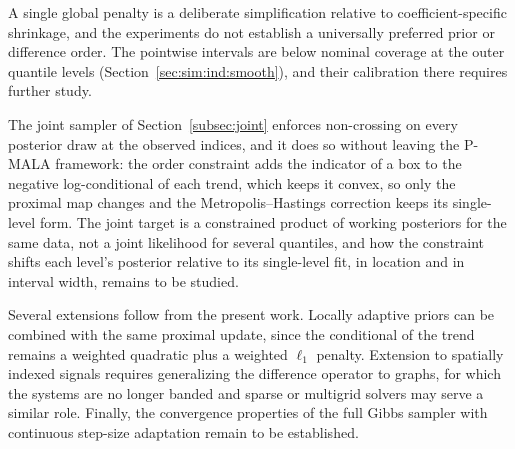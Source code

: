 A single global penalty is a deliberate simplification relative to coefficient-specific shrinkage, and the experiments do not establish a universally preferred prior or difference order. The pointwise intervals are below nominal coverage at the outer quantile levels (Section~\ref{sec:sim:ind:smooth}), and their calibration there requires further study.

The joint sampler of Section~\ref{subsec:joint} enforces non-crossing on every posterior draw at the observed indices, and it does so without leaving the P-MALA framework: the order constraint adds the indicator of a box to the negative log-conditional of each trend, which keeps it convex, so only the proximal map changes and the Metropolis--Hastings correction keeps its single-level form. The joint target is a constrained product of working posteriors for the same data, not a joint likelihood for several quantiles, and how the constraint shifts each level's posterior relative to its single-level fit, in location and in interval width, remains to be studied.

Several extensions follow from the present work. Locally adaptive priors can be combined with the same proximal update, since the conditional of the trend remains a weighted quadratic plus a weighted $\ell_1$ penalty. Extension to spatially indexed signals requires generalizing the difference operator to graphs, for which the systems are no longer banded and sparse or multigrid solvers may serve a similar role. Finally, the convergence properties of the full Gibbs sampler with continuous step-size adaptation remain to be established.
